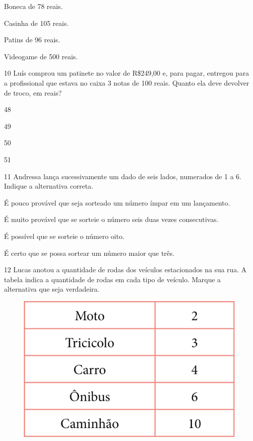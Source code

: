 \begin{escolha}[itemsep=-5pt]
\item Boneca de 78 reais.

\item Casinha de 105 reais.

\item Patins de 96 reais.

\item Videogame de 500 reais.
\end{escolha}

\num{10} Luís comprou um patinete no valor de R\$249,00 e, para pagar, entregou
para a profissional que estava no caixa 3 notas de 100 reais. Quanto ela deve devolver de troco, em reais?

\begin{multicols}{2}
\begin{escolha}[itemsep=-5pt]
\item 48

\item 49

\item 50

\item 51
\end{escolha}
\end{multicols}

\num{11} Andressa lança sucessivamente um dado de seis lados, numerados de 1 a 6.
Indique a alternativa correta.

\begin{escolha}[itemsep=-5pt]
\item É pouco provável que seja sorteado um número ímpar em um lançamento.

\item É muito provável que se sorteie o número seis duas vezes consecutivas.

\item É possível que se sorteie o número oito.

\item É certo que se possa sortear um número maior que três.
\end{escolha}


\num{12} Lucas anotou a quantidade de rodas dos veículos estacionados na sua rua.
A tabela indica a quantidade de rodas em cada tipo de veículo. Marque a
alternativa que seja verdadeira.

\begin{figure}[H]
\centering
\includegraphics[width=.8\textwidth]{./media/image157.png}
\end{figure}

